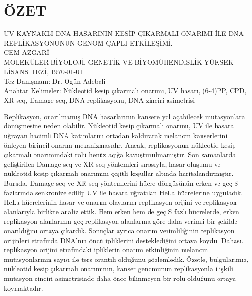 \chapter*{\vspace{-4\baselineskip} \bf ÖZET} 
\begin{otherlanguage}{turkish}
\begin{center}
\MakeUppercase{UV KAYNAKLI DNA HASARININ KESİP ÇIKARMALI ONARIMI İLE DNA REPLİKASYONUNUN GENOM ÇAPLI ETKİLEŞİMİ.} \\[3\baselineskip]
\MakeUppercase{CEM AZGARİ} \\[\baselineskip]
MOLEKÜLER BİYOLOJİ, GENETİK VE BİYOMÜHENDİSLİK YÜKSEK LİSANS TEZİ, \Cemdateformat\today \\[\baselineskip]
Tez Danışmanı: Dr. Ogün Adebali \\[2\baselineskip]
Anahtar Kelimeler: Nükleotid kesip çıkarmalı onarımı, UV hasarı, (6-4)PP, CPD, XR-seq, Damage-seq, DNA replikasyonu, DNA zinciri asimetrisi \\[2\baselineskip]
\end{center}

\singlespacing
Replikasyon, onarılmamış DNA hasarlarının kansere yol açabilecek mutasyonlara dönüşmesine neden olabilir. Nükleotid kesip çıkarmalı onarımı, UV ile hasara uğrayan hacimli DNA katımlarını ortadan kaldırarak melanom kanserlerini önleyen birincil onarım mekanizmasıdır. Ancak, replikasyonun nükleotid kesip çıkarmalı onarımındaki rolü henüz açığa kavuşturulmamıştır. Son zamanlarda geliştirilen Damage-seq ve XR-seq yöntemleri sırasıyla, hasar oluşumu ve nükleotid kesip çıkarmalı onarımını çeşitli koşullar altında haritalandırmıştır. Burada, Damage-seq ve XR-seq yöntemlerini hücre döngüsünün erken ve geç S fazlarında senkronize edilip UV ile hasara uğratılan HeLa hücrelerine uyguladık. HeLa hücrelerinin hasar ve onarım olaylarını replikasyon orijini ve replikasyon alanlarıyla birlikte analiz ettik. Hem erken hem de geç S fazlı hücrelerde, erken replikasyon alanlarının geç replikasyon alanlarına göre daha verimli bir şekilde onarıldığını ortaya çıkardık. Sonuçlar ayrıca onarım verimliliğinin replikasyon orijinleri etrafında DNA'nın öncü ipliklerini desteklediğini ortaya koydu. Dahası, replikasyon orijini etrafındaki ipliklerin onarım etkinliğinin melanom mutasyonlarının sayısı ile ters orantılı olduğunu gözlemledik. Özetle, bulgularımız, nükleotid kesip çıkarmalı onarımının, kanser genomunun replikasyonla ilişkili mutasyon zinciri asimetrisinde daha önce bilinmeyen bir rolü olduğunu ortaya koymaktadır.

\end{otherlanguage}

\clearpage\pagebreak
\onehalfspacing